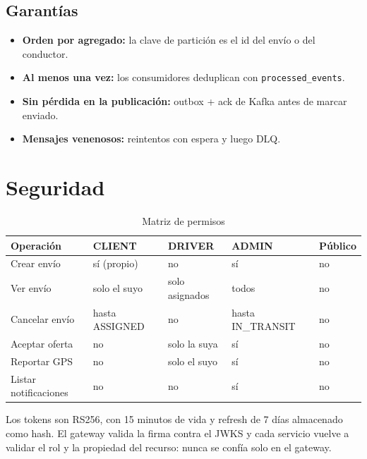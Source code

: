 \documentclass[10pt,letterpaper,twocolumn,oneside]{report}
\newcommand{\pkg}[1]{\texttt{#1}}
\begin{document}
\section{Garantías}

\begin{itemize}[leftmargin=1.2cm]
  \item \textbf{Orden por agregado:} la clave de partición es el id del envío o del conductor.
  \item \textbf{Al menos una vez:} los consumidores deduplican con \pkg{processed\_events}.
  \item \textbf{Sin pérdida en la publicación:} outbox + ack de Kafka antes de marcar enviado.
  \item \textbf{Mensajes venenosos:} reintentos con espera y luego DLQ.
\end{itemize}

\chapter{Seguridad}

\begin{table}[t]
\centering
\caption{Matriz de permisos}
\small
\begin{tabular}{@{}L{5.6cm}L{2.2cm}L{2.2cm}L{2.2cm}L{2.2cm}@{}}
\toprule
\textbf{Operación} & \textbf{CLIENT} & \textbf{DRIVER} & \textbf{ADMIN} & \textbf{Público}\\
\midrule
Crear envío & sí (propio) & no & sí & no\\
Ver envío & solo el suyo & solo asignados & todos & no\\
Cancelar envío & hasta ASSIGNED & no & hasta IN\_TRANSIT & no\\
Aceptar oferta & no & solo la suya & sí & no\\
Reportar GPS & no & solo el suyo & sí & no\\
Listar notificaciones & no & no & sí & no\\
\bottomrule
\end{tabular}
\end{table}

Los tokens son RS256, con 15 minutos de vida y refresh de 7 días almacenado como hash. El gateway
valida la firma contra el JWKS y cada servicio vuelve a validar el rol y la propiedad del recurso:
nunca se confía solo en el gateway.
\end{document}
